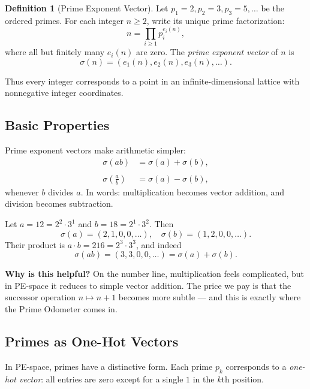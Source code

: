 \documentclass[11pt]{article}
\theoremstyle{definition}
\newtheorem{definition}{Definition}[section]
\begin{document}
\begin{definition}[Prime Exponent Vector]
Let $p_1 = 2, p_2 = 3, p_3 = 5, \dots$ be the ordered primes. 
For each integer $n \geq 2$, write its unique prime factorization:
\[
n = \prod_{i \geq 1} p_i^{e_i(n)} ,
\]
where all but finitely many $e_i(n)$ are zero. 
The \emph{prime exponent vector} of $n$ is
\[
\sigma(n) = (e_1(n), e_2(n), e_3(n), \dots).
\]
\end{definition}

Thus every integer corresponds to a point in an infinite-dimensional lattice 
with nonnegative integer coordinates. 

\subsection{Basic Properties}
Prime exponent vectors make arithmetic simpler:
\begin{align*}
\sigma(ab) &= \sigma(a) + \sigma(b), \\\\
\sigma\!\left(\frac{a}{b}\right) &= \sigma(a) - \sigma(b),
\end{align*}
whenever $b$ divides $a$. In words: multiplication becomes vector addition, 
and division becomes subtraction.

\begin{studentexample}
Let $a = 12 = 2^2 \cdot 3^1$ and $b = 18 = 2^1 \cdot 3^2$.  
Then
\[
\sigma(a) = (2,1,0,0,\dots), \quad \sigma(b) = (1,2,0,0,\dots).
\]
Their product is $a \cdot b = 216 = 2^3 \cdot 3^3$, and indeed
\[
\sigma(ab) = (3,3,0,0,\dots) = \sigma(a) + \sigma(b).
\]
\end{studentexample}

\begin{studentnote}
\textbf{Why is this helpful?}  
On the number line, multiplication feels complicated, 
but in PE-space it reduces to simple vector addition. 
The price we pay is that the successor operation $n \mapsto n+1$ 
becomes more subtle --- and this is exactly where the Prime Odometer comes in. 
\end{studentnote}

\subsection{Primes as One-Hot Vectors}
In PE-space, primes have a distinctive form.  
Each prime $p_k$ corresponds to a \emph{one-hot vector}: all entries are zero except 
for a single $1$ in the $k$th position.
\end{document}
